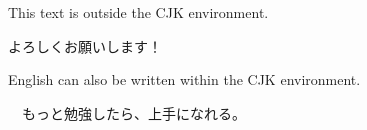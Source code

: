 \documentclass{article}
\begin{document}
This text is outside the CJK environment.

\begin{CJK*}{UTF8}{min}
よろしくお願いします！

English can also be written within the CJK environment.

{　もっと勉強したら、上手になれる。}

\end{CJK*}
\end{document}
